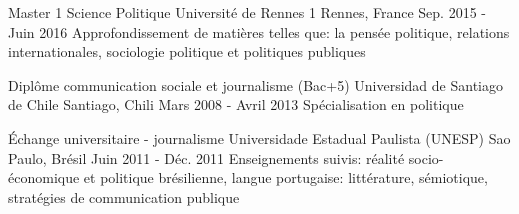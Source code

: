 \documentclass[11pt, a4paper]{awesome-cv}
\begin{document}
\makecvheader


\vspace{0.8cm}
\begin{cventries}
  \cventry   
    {Master 1 Science Politique}					%
    {Université de Rennes 1}						%
    {Rennes, France}							%
    {Sep. 2015 - Juin 2016} 						%
    {Approfondissement de matières telles que: la pensée politique, relations internationales, 
    sociologie politique et politiques publiques}									%
    
  \cventry   
    {Diplôme communication sociale et journalisme (Bac+5)}		%
    {Universidad de Santiago de Chile }					%
    {Santiago, Chili}							%
    {Mars 2008 - Avril 2013} 						%
    {Spécialisation en politique}									%
    
    
  \cventry   
    {\'Echange universitaire - journalisme}		                %
    {Universidade Estadual Paulista (UNESP)}	%
    {Sao Paulo, Brésil}							%
    {Juin 2011 - Déc. 2011} 						%
    {Enseignements suivis: réalité socio-économique et politique brésilienne, langue portugaise: littérature, sémiotique, stratégies de communication publique }	    								%
    
  
\end{cventries}								%
\end{document}
